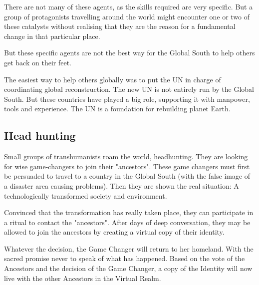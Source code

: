 There are not many of these agents, as the skills required are very specific. But a group of protagonists travelling around the world might encounter one or two of these catalysts without realising that they are the reason for a fundamental change in that particular place.

But these specific agents are not the best way for the Global South to help others get back on their feet.

The easiest way to help others globally was to put the UN in charge of coordinating global reconstruction. The new UN is not entirely run by the Global South. But these countries have played a big role, supporting it with manpower, tools and experience. The UN is a foundation for rebuilding planet Earth.

\subsection{Head hunting}

Small groups of transhumanists roam the world, headhunting. They are looking for wise game-changers to join their "ancestors". These game changers must first be persuaded to travel to a country in the Global South (with the false image of a disaster area causing problems).
Then they are shown the real situation: A technologically transformed society and environment.

Convinced that the transformation has really taken place, they can participate in a ritual to contact the "ancestors". After days of deep conversation, they may be allowed to join the ancestors by creating a virtual copy of their identity.

Whatever the decision, the Game Changer will return to her homeland. With the sacred promise never to speak of what has happened. Based on the vote of the Ancestors and the decision of the Game Changer, a copy of the Identity will now live with the other Ancestors in the Virtual Realm.






